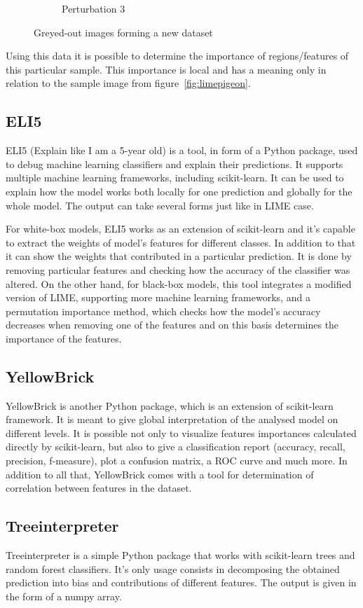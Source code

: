 \begin{figure}[H]
\begin{subfigure}[t]{0.32\linewidth}
        \caption{Perturbation 3}
    \end{subfigure}
    \caption{Greyed-out images forming a new dataset}
    \label{fig:limegrey}
\end{figure}

Using this data it is possible to determine the importance of regions/features of this particular sample. This importance is local and has a meaning only in relation to the sample image from figure~\ref{fig:limepigeon}. 

\subsection{ELI5}
ELI5 (Explain like I am a 5-year old) is a tool, in form of a Python package, used to debug machine learning classifiers and explain their predictions. It supports multiple machine learning frameworks, including scikit-learn. It can be used to explain how the model works both locally for one prediction and globally for the whole model. The output can take several forms just like in LIME case.

For white-box models, ELI5 works as an extension of scikit-learn and it's capable to extract the weights of model's features for different classes. In addition to that it can show the weights that contributed in a particular prediction. It is done by removing particular features and checking how the accuracy of the classifier was altered. On the other hand, for black-box models, this tool integrates a modified version of LIME, supporting more machine learning frameworks, and a permutation importance method, which checks how the model's accuracy decreases when removing one of the features and on this basis determines the importance of the features.

\subsection{YellowBrick}
YellowBrick is another Python package, which is an extension of scikit-learn framework. It is meant to give global interpretation of the analysed model on different levels. It is possible not only to visualize features importances calculated directly by scikit-learn, but also to give a classification report (accuracy, recall, precision, f-measure), plot a confusion matrix, a ROC curve and much more. In addition to all that, YellowBrick comes with a tool for determination of correlation between features in the dataset.

\subsection{Treeinterpreter}
Treeinterpreter is a simple Python package that works with scikit-learn trees and random forest classifiers. It's only usage consists in decomposing the obtained prediction into bias and contributions of different features. The output is given in the form of a numpy array.

